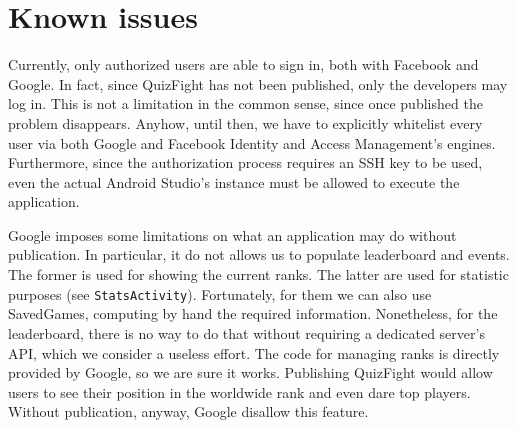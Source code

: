 \section{Known issues}\label{sec:issues}
Currently, only authorized users are able to sign in, both with Facebook and
Google. In fact, since QuizFight has not been published, only the developers
may log in. This is not a limitation in the common sense, since once published
the problem disappears. Anyhow, until then, we have to explicitly whitelist
every user via both Google and Facebook Identity and Access Management's engines.
Furthermore, since the authorization process requires an SSH key to be used, 
even the actual Android Studio's instance must be allowed to execute
the application. 

Google imposes some limitations on what an application may do without
publication. In particular, it do not allows us to populate leaderboard and
events. The former is used for showing the current ranks. The latter are used
for statistic purposes (see \texttt{StatsActivity}). Fortunately, for them we
can also use SavedGames, computing by hand the required information. Nonetheless,
for the leaderboard, there is no way to do that without requiring a dedicated
server's API, which we consider a useless effort. The code for managing ranks
is directly provided by Google, so we are sure it works. Publishing QuizFight
would allow users to see their position in the worldwide rank and even dare top
players. Without publication, anyway, Google disallow this feature.

